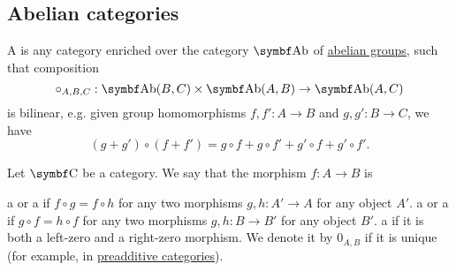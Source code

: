 \subsection{Abelian categories}\label{subsec:abelian_categories}

\begin{definition}\label{def:preadditive_category}
  A  is any category enriched over the category \( \Cat{Ab} \) of \hyperref[thm:ab_is_abelian]{abelian groups}, such that composition
  \begin{equation*}
    \circ_{A,B,C}: \Cat{Ab}(B, C) \times \Cat{Ab}(A, B) \to \Cat{Ab}(A, C)
  \end{equation*}
  is bilinear, e.g. given group homomorphisms \( f, f': A \to B \) and \( g, g': B \to C \), we have
  \begin{equation*}
    (g + g') \circ (f + f') = g \circ f + g \circ f' + g' \circ f + g' \circ f'.
  \end{equation*}
\end{definition}

\begin{definition}\label{def:zero_morphism}
  Let \( \Cat{C} \) be a category. We say that the morphism \( f: A \to B \) is
  \begin{DefEnum}
     a  or a  if \( f \circ g = f \circ h \) for any two morphisms \( g, h: A' \to A \) for any object \( A' \).
     a  or a  if \( g \circ f = h \circ f \) for any two morphisms \( g, h: B \to B' \) for any object \( B' \).
     a  if it is both a left-zero and a right-zero morphism. We denote it by \( 0_{A,B} \) if it is unique (for example, in \hyperref[def:preadditive_category]{preadditive categories}).
  \end{DefEnum}
\end{definition}

